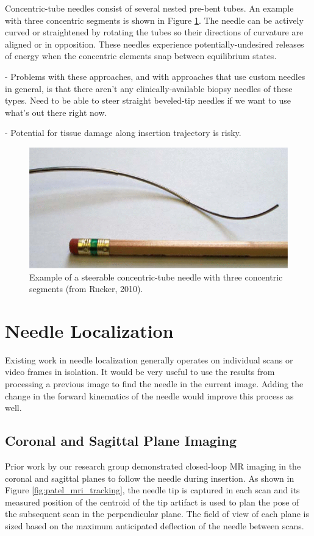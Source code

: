 Concentric-tube needles consist of several nested pre-bent tubes\cite{webster_mechanics_2009, rucker_geometrically_2010, dupont_design_2010-1}. An example with three concentric segments is shown in Figure \ref{fig:concentric_tubes}. The needle can be actively curved or straightened by rotating the tubes so their directions of curvature are aligned or in opposition. These needles experience potentially-undesired releases of energy when the concentric elements snap between equilibrium states.

- Problems with these approaches, and with approaches that use custom needles in general, is that there aren't any clinically-available biopsy needles of these types. Need to be able to steer straight beveled-tip needles if we want to use what's out there right now.

- Potential for tissue damage along insertion trajectory is risky.

\begin{figure}[h]
\includegraphics[width=1.0\textwidth]{Fig/chap2/concentric_needle.png}
\caption{Example of a steerable concentric-tube needle with three concentric segments (from Rucker, 2010\cite{rucker_geometrically_2010}).}
\label{fig:concentric_tubes}
\end{figure}

\section{Needle Localization}
Existing work in needle localization generally operates on individual scans or video frames in isolation. It would be very useful to use the results from processing a previous image to find the needle in the current image. Adding the change in the forward kinematics of the needle would improve this process as well.

\subsection{Coronal and Sagittal Plane Imaging}
Prior work by our research group demonstrated closed-loop MR imaging in the coronal and sagittal planes to follow the needle during insertion\cite{patel_closed-loop_2015}. As shown in Figure \ref{fig:patel_mri_tracking}, the needle tip is captured in each scan and its measured position of the centroid of the tip artifact is used to plan the pose of the subsequent scan in the perpendicular plane. The field of view of each plane is sized based on the maximum anticipated deflection of the needle between scans.

